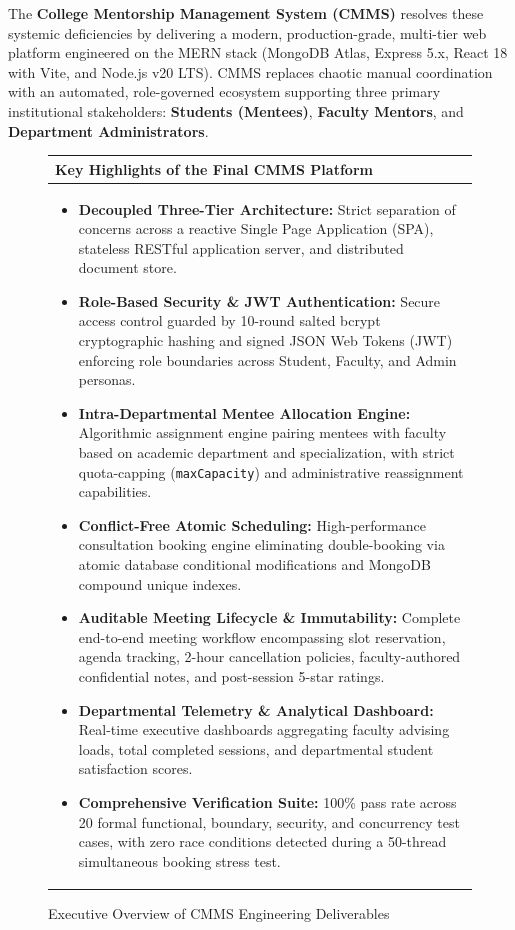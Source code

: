 \documentclass[11pt,a4paper]{article}
\begin{document}
The \textbf{College Mentorship Management System (CMMS)} resolves these systemic deficiencies by delivering a modern, production-grade, multi-tier web platform engineered on the MERN stack (MongoDB Atlas, Express 5.x, React 18 with Vite, and Node.js v20 LTS). CMMS replaces chaotic manual coordination with an automated, role-governed ecosystem supporting three primary institutional stakeholders: \textbf{Students (Mentees)}, \textbf{Faculty Mentors}, and \textbf{Department Administrators}.

\begin{figure}[H]
\centering
\begin{tabular}{|p{}|}
\hline
\rowcolor{lightgray} \textbf{\color{primary}Key Highlights of the Final CMMS Platform} \\
\hline
\begin{itemize}[leftmargin=1.4em, itemsep=0.2em]
  \item \textbf{Decoupled Three-Tier Architecture:} Strict separation of concerns across a reactive Single Page Application (SPA), stateless RESTful application server, and distributed document store.
  \item \textbf{Role-Based Security \& JWT Authentication:} Secure access control guarded by 10-round salted bcrypt cryptographic hashing and signed JSON Web Tokens (JWT) enforcing role boundaries across Student, Faculty, and Admin personas.
  \item \textbf{Intra-Departmental Mentee Allocation Engine:} Algorithmic assignment engine pairing mentees with faculty based on academic department and specialization, with strict quota-capping (\texttt{maxCapacity}) and administrative reassignment capabilities.
  \item \textbf{Conflict-Free Atomic Scheduling:} High-performance consultation booking engine eliminating double-booking via atomic database conditional modifications and MongoDB compound unique indexes.
  \item \textbf{Auditable Meeting Lifecycle \& Immutability:} Complete end-to-end meeting workflow encompassing slot reservation, agenda tracking, 2-hour cancellation policies, faculty-authored confidential notes, and post-session 5-star ratings.
  \item \textbf{Departmental Telemetry \& Analytical Dashboard:} Real-time executive dashboards aggregating faculty advising loads, total completed sessions, and departmental student satisfaction scores.
  \item \textbf{Comprehensive Verification Suite:} 100\% pass rate across 20 formal functional, boundary, security, and concurrency test cases, with zero race conditions detected during a 50-thread simultaneous booking stress test.
\end{itemize} \\
\hline
\end{tabular}
\caption{Executive Overview of CMMS Engineering Deliverables}
\label{fig:exec_summary}
\end{figure}
\end{document}

